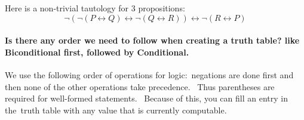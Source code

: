 \documentclass[10pt,english]{article}
\begin{document}
Here is a non-trivial tautology for 3 propositions: \[ \neg( \neg (P \leftrightarrow Q)  \leftrightarrow \neg (Q \leftrightarrow R) ) \leftrightarrow \neg (R \leftrightarrow P) \]


\paragraph{Is there any order we need to follow when creating a truth table? like Biconditional first, followed by Conditional.}

We use the following order of operations for logic: negations are done first and then none of the other operations take precedence.  Thus parentheses are required for well-formed statements.  Because of this, you can fill an entry in the truth table with any value that is currently computable.
\end{document}
